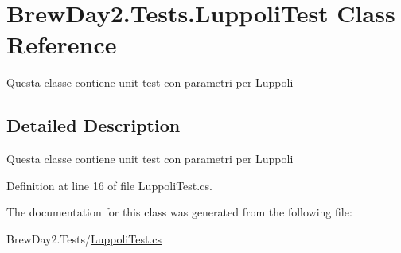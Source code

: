 \hypertarget{class_brew_day2_1_1_tests_1_1_luppoli_test}{}\section{Brew\+Day2.\+Tests.\+Luppoli\+Test Class Reference}
\label{class_brew_day2_1_1_tests_1_1_luppoli_test}


Questa classe contiene unit test con parametri per Luppoli 




\subsection{Detailed Description}
Questa classe contiene unit test con parametri per Luppoli



Definition at line 16 of file Luppoli\+Test.\+cs.



The documentation for this class was generated from the following file\+:\begin{DoxyCompactItemize}
\item 
Brew\+Day2.\+Tests/\mbox{\hyperlink{_luppoli_test_8cs}{Luppoli\+Test.\+cs}}\end{DoxyCompactItemize}
